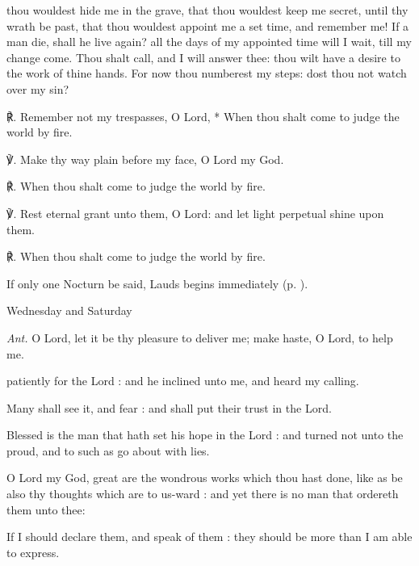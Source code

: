  thou wouldest hide me in the grave, that thou wouldest keep me secret, until thy wrath be past, that thou wouldest appoint me a set time, and remember me! If a man die, shall he live again? all the days of my appointed time will I wait, till my change come. Thou shalt call, and I will answer thee: thou wilt have a desire to the work of thine hands. For now thou numberest my steps: dost thou not watch over my sin?\par
℟. Remember not {\dag} my trespasses, O Lord, * When thou shalt come to judge the world by fire.\par
℣. Make thy way plain before my face, O Lord my God.\par
℟. When thou shalt come to judge the world by fire.\par
℣. Rest eternal grant unto them, O Lord: and let light perpetual shine upon them.\par
℟. When thou shalt come to judge the world by fire.
\begin{rubric}
    {If only one Nocturn be said, Lauds begins immediately (p. \pageref{laudsdead}).}
\end{rubric}
\begin{inhead}
Wednesday and Saturday
\end{inhead}
\par\noindent
\textit{Ant.} O Lord, {\dag} let it be thy pleasure to deliver me; make haste, O Lord, to help me.\par
{} patiently for the Lord : and he inclined unto me, and heard my calling.\par
{}
Many shall see it, and fear : and shall put their trust in the Lord.\par
{}Blessed is the man that hath set his hope in the Lord : and turned not unto the proud, and to such as go about with lies.\par
{}O Lord my God, great are the wondrous works which thou hast done, like as be also thy thoughts which are to us-ward : and yet there is no man that ordereth them unto thee:\par
{}If I should declare them, and speak of them : they should be more than I am able to express.\par
